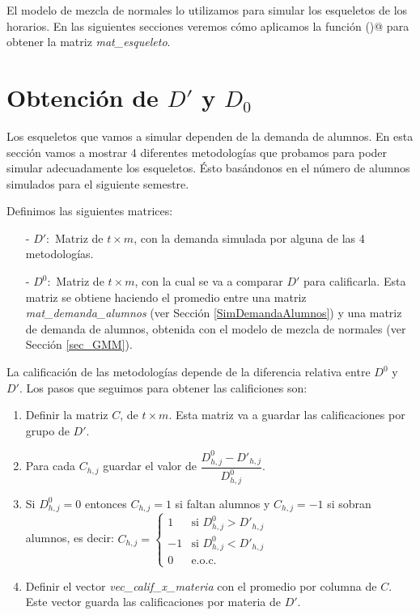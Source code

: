 El modelo de mezcla de normales lo utilizamos para simular los esqueletos de los horarios. En las siguientes secciones veremos cómo aplicamos la función \verb@normalmixEM()@ para obtener la matriz \textit{mat\_esqueleto}.


\section{Obtención de $D'$ y $D_{0}$} \label{GMM_D}

Los esqueletos que vamos a simular dependen de la demanda de alumnos. En esta sección vamos a mostrar 4 diferentes metodologías que probamos para poder simular adecuadamente los esqueletos. Ésto basándonos en el número de alumnos simulados para el siguiente semestre. %


Definimos las siguientes matrices:

\begin{itemize}
\item[-] $D': $ Matriz de $t \times m$, con la demanda simulada por alguna de las 4 metodologías.

\item[-] $D^{0}: $ Matriz de $t \times m$, con la cual se va a comparar $D'$ para calificarla. Esta matriz se obtiene haciendo el promedio entre una matriz \textit{mat\_demanda\_alumnos} (ver Sección \ref{SimDemandaAlumnos}) y una matriz de demanda de alumnos, obtenida con el modelo de mezcla de normales (ver Sección \ref{sec_GMM}).
\end{itemize}

La calificación de las metodologías depende de la diferencia relativa entre $D^{0}$ y $D'$. Los pasos que seguimos para obtener las calificiones son:

\begin{enumerate}
\item Definir la matriz $C$, de $t \times m$. Esta matriz va a guardar las calificaciones por grupo de $D'$.

\item Para cada $C_{h,j}$ guardar el valor de $\dfrac{D_{h,j}^{0} - D'_{h,j}}{D_{h,j}^{0}}$. 

\item Si $D_{h,j}^{0} = 0$ entonces $C_{h,j} = 1$ si faltan alumnos y $C_{h,j} = -1$ si sobran alumnos, es decir: $C_{h,j} = \left \{ \begin{matrix} 1 & \mbox{si }D_{h,j}^{0} > D'_{h,j}\\ 
-1 & \mbox{si }D_{h,j}^{0} < D'_{h,j}\\ 0 & \mbox{e.o.c. }\end{matrix}\right.$



\item Definir el vector \textit{vec\_calif\_x\_materia} con el promedio por columna de $C$. Este vector guarda las calificaciones por materia de $D'$.
\end{enumerate}

